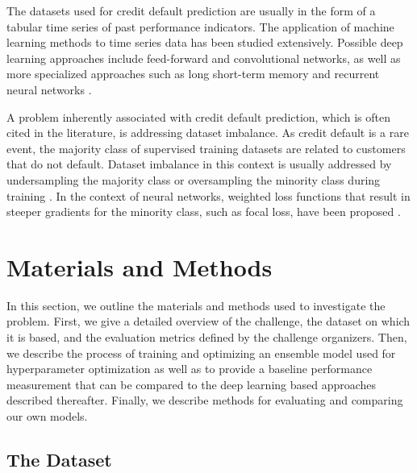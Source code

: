 \documentclass[runningheads]{llncs}
\begin{document}
The datasets used for credit default prediction are usually in the form of a tabular time series of past performance indicators. The application of machine learning methods to time series data has been studied extensively. Possible deep learning approaches include feed-forward and convolutional networks, as well as more specialized approaches such as long short-term memory and recurrent neural networks \cite{katarya2018study}. 

A problem inherently associated with credit default prediction, which is often cited in the literature, is addressing dataset imbalance. As credit default is a rare event, the majority class of supervised training datasets are related to customers that do not default. Dataset imbalance in this context is usually addressed by undersampling the majority class or oversampling the minority class during training \cite{kubat1997addressing}. In the context of neural networks, weighted loss functions that result in steeper gradients for the minority class, such as focal loss, have been proposed \cite{lin2017focal}.


\section{Materials and Methods}
\label{sec:methods}

In this section, we outline the materials and methods used to investigate the problem. First, we give a detailed overview of the challenge, the dataset on which it is based, and the evaluation metrics defined by the challenge organizers. Then, we describe the process of training and optimizing an ensemble model used for hyperparameter optimization as well as to provide a baseline performance measurement that can be compared to the deep learning based approaches described thereafter. Finally, we describe methods for evaluating and comparing our own models.

\subsection{The Dataset}
\label{sec:the-dataset}
\end{document}
